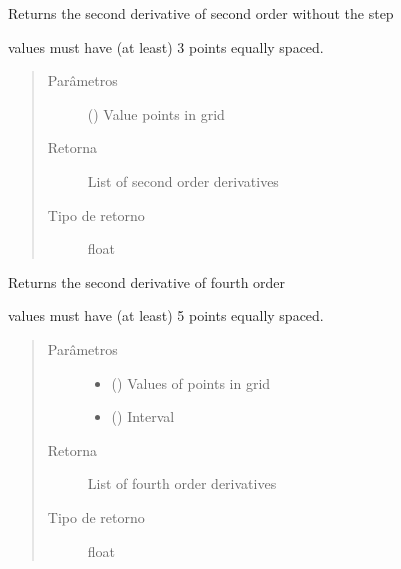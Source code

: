 \documentclass[letterpaper,10pt,brazil]{sphinxmanual}
\begin{document}

\begin{fulllineitems}
\label{\detokenize{source/wave:wave.fp_second_order_term}}
Returns the second derivative of second order without the step

values must have (at least) 3 points equally spaced.
\begin{quote}\begin{description}
\item[{Parâmetros}] \leavevmode
{} () \textendash{} Value points in grid

\item[{Retorna}] \leavevmode
List of second order derivatives

\item[{Tipo de retorno}] \leavevmode
float

\end{description}\end{quote}

\end{fulllineitems}


\begin{fulllineitems}
\label{\detokenize{source/wave:wave.fpp_fourth_order}}
Returns the second derivative of fourth order

values must have (at least) 5 points equally spaced.
\begin{quote}\begin{description}
\item[{Parâmetros}] \leavevmode\begin{itemize}
\item {} 
 () \textendash{} Values of points in grid

\item {} 
 () \textendash{} Interval

\end{itemize}

\item[{Retorna}] \leavevmode
List of fourth order derivatives

\item[{Tipo de retorno}] \leavevmode
float

\end{description}\end{quote}

\end{fulllineitems}
\end{document}
